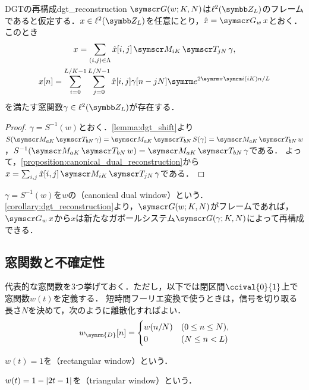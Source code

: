 \documentclass[../../main]{subfiles}
\begin{document}
\begin{corollary}{DGTの再構成}{dgt_reconstruction}
  \(\gaborsys{w}{K}{N}\)は\(\cycles{L}\)のフレームであると仮定する．\(x\in\cycles{L}\)を任意にとり，\(\hat{x}=\dgt{w}x\)とおく．このとき
  \begin{gather*}
    x = \sum_{(i,j)\in\Lambda}\hat{x}[i,j]\modulate{iK}\translate{jN}\gamma, \\
    x[n] = \sum_{i=0}^{L/K-1}\sum_{j=0}^{L/N-1}\hat{x}[i,j]\gamma[n-jN]\napr^{2\krez\iuni(iK)n/L}
  \end{gather*}
  を満たす窓関数\(\gamma\in\cycles{L}\)が存在する．
\end{corollary}

\begin{proof}
  \(\gamma=S^{-1}(w)\)とおく．\cref{lemma:dgt_shift}より\(S(\modulate{aK}\translate{bN}\gamma)=\modulate{aK}\translate{bN}S(\gamma)=\modulate{aK}\translate{bN}w\)，\(S^{-1}(\modulate{aK}\translate{bN}w)=\modulate{aK}\translate{bN}\gamma\)である．
  よって，\cref{proposition:canonical_dual_reconstruction}から\(x=\sum_{i,j}\hat{x}[i,j]\modulate{iK}\translate{jN}\gamma\)である．
\end{proof}

\(\gamma=S^{-1}(w)\)を\(w\)の（canonical dual window）という．
\cref{corollary:dgt_reconstruction}より，\(\gaborsys{w}{K}{N}\)がフレームであれば，\(\dgt{w}x\)から\(x\)は新たなガボールシステム\(\gaborsys{\gamma}{K}{N}\)によって再構成できる．

\subsection{窓関数と不確定性}

代表的な窓関数を3つ挙げておく．ただし，以下では閉区間\(\ccival{0}{1}\)上で窓関数\(w(t)\)を定義する．
短時間フーリエ変換で使うときは，信号を切り取る長さ\(N\)を決めて，次のように離散化すればよい．
\[
  w_{\symrm{D}}[n] = \begin{cases}w(n/N) & (0\leq n\leq N), \\ 0 & (N\leq n<L)\end{cases}
\]

\begin{example}
  \(w(t)=1\)を（rectangular window）という．  
\end{example}

\begin{example}
  \(w(t)=1-\lvert2t-1\rvert\)を（triangular window）という．
\end{example}
\end{document}
